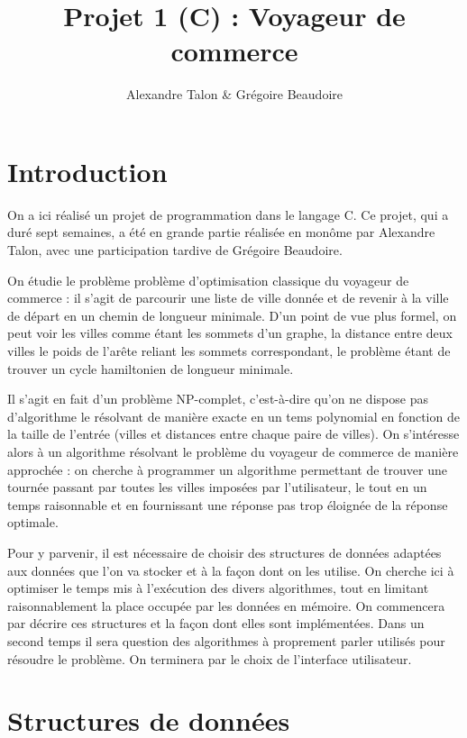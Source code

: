 \documentclass{article}
\title{Projet 1 (C) : Voyageur de commerce}
\author{Alexandre Talon \& Grégoire Beaudoire}
\begin{document}
\maketitle
\tableofcontents
\section*{Introduction}
On a ici réalisé un projet de programmation dans le langage C. Ce projet, qui a duré sept semaines, a été en grande partie réalisée en monôme par Alexandre Talon, avec une participation tardive de Grégoire Beaudoire.

On étudie le problème problème d'optimisation classique du voyageur de commerce : il s'agit de parcourir une liste de ville donnée et de revenir à la ville de départ
en un chemin de longueur minimale. D'un point de vue plus formel, on peut voir les villes comme étant les sommets d'un graphe, la distance entre deux villes le poids de 
l'arête reliant les sommets correspondant, le problème étant de trouver un cycle hamiltonien de longueur minimale.


Il s'agit en fait d'un problème NP-complet, c'est-à-dire qu'on ne dispose pas d'algorithme le résolvant de manière exacte en un tems polynomial en fonction de la taille
de l'entrée (villes et distances entre chaque paire de villes). On s'intéresse alors à un algorithme résolvant le problème du voyageur de commerce de manière approchée :
on cherche à programmer un algorithme permettant de trouver une tournée passant par toutes les villes imposées par l'utilisateur, le tout en un temps raisonnable et en
fournissant une réponse pas trop éloignée de la réponse optimale.


Pour y parvenir, il est nécessaire de choisir des structures de données adaptées aux données que l'on va stocker et à la façon dont on les utilise. On cherche
ici à optimiser le temps mis à l'exécution des divers algorithmes, tout en limitant raisonnablement la place occupée par les données en mémoire. On commencera par
décrire ces structures et la façon dont elles sont implémentées. Dans un second temps il sera question des algorithmes à proprement parler utilisés pour résoudre
le problème. On terminera par le choix de l'interface utilisateur.

\section{Structures de données}
\end{document}
